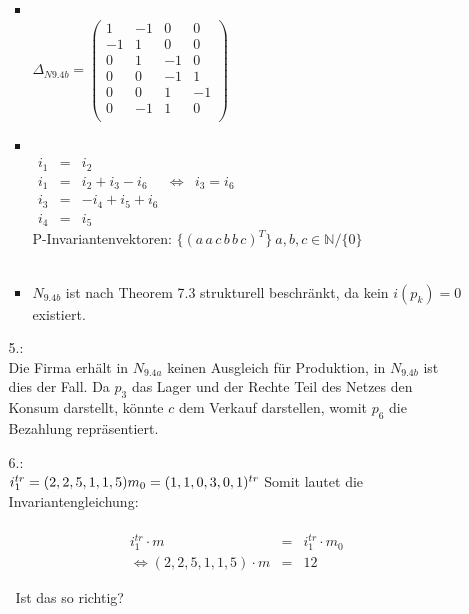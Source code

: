 \documentclass[a4paper,11pt,fleqn]{scrartcl}
\begin{document}
\begin{enumerate}
\begin{enumerate}
\begin{itemize}
				\item \quad \\
				\( \Delta_{N9.4b} =
			\begin{pmatrix}
				1 & -1 & 0 & 0 \\
				-1 & 1 & 0 & 0 \\
				0 & 1 & -1 & 0 \\
				0 & 0 & -1 & 1 \\
				0 & 0 & 1 & -1 \\
				0 & -1 & 1 & 0 \\
			\end{pmatrix}
			\) \\
			\item \quad \\
			\(\begin{array}{rclcl}
				i_1 &=& i_2 \\
				i_1 &=& i_2 + i_3 - i_6 &\Leftrightarrow & i_3 = i_6 \\
				i_3 &=& -i_4 + i_5 + i_6 \\
				i_4 &=& i_5
			\end{array}
			\) \\
			P-Invariantenvektoren: \(\Big\{(a\,a\,c\,b\,b\,c)^T\Big\}\ a,b,c\in\mathbb{N}/\{0\}\) \\ \\
			\item \(N_{9.4b}\) ist nach Theorem 7.3 strukturell beschränkt, da kein \(i(p_k) = 0\) existiert. \\
			
			\end{itemize}
			\item[5.:]\quad \\
			Die Firma erhält in \(N_{9.4a}\) keinen Ausgleich für Produktion, in \(N_{9.4b}\) ist dies der Fall.
			Da \(p_3\) das Lager und der Rechte Teil des Netzes den Konsum darstellt, könnte \(c\) dem Verkauf 
			darstellen, womit \(p_6\) die Bezahlung repräsentiert.
			\item[6.:]\quad \\
			\(
				i_1^{tr} = (2,2,5,1,1,5) \\
				m_0 = (1,1,0,3,0,1)^{tr} \\
				\\
			\)
			Somit lautet die Invariantengleichung: \\
			\\
			\begin{align}
				i_1^{tr} \cdot m &=& i_1^{tr} \cdot m_0 \\
				\Leftrightarrow (2,2,5,1,1,5) \cdot m &=& 12
			\end{align}

			\todo \ Ist das so richtig?
		\end{enumerate}
	\end{enumerate}
\end{document}
